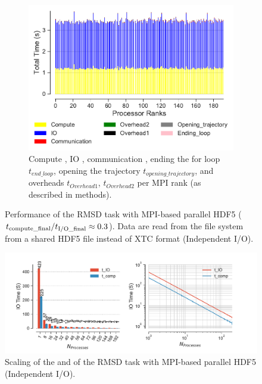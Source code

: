\begin{figure}
\begin{subfigure} {.8\textwidth}
  \includegraphics[width=\linewidth]{figures/hdf5-BarPlot-rank-comparison_192_4.pdf}
  \caption{Compute \tcomp, IO \tIO, communication \tcomm , ending the for loop $t_{end\_loop}$,
  opening the trajectory $t_{opening\_trajectory}$, and overheads $t_{Overhead1}$,  $t_{Overhead2}$ per MPI rank (as described in methods).}
  \label{fig:MPIranks-hdf5}
\end{subfigure}
%
\caption{Performance of the RMSD task with MPI-based parallel HDF5 (${t}_{\text{compute\_final}}/{t}_{\text{I/O\_final}} \approx 0.3$).
Data are read from the file system from a shared HDF5 file instead of XTC format (Independent I/O).}
\label{fig:MPIwithIO-hdf5}
\end{figure}

\begin{figure}
\centering
  \includegraphics[width=\linewidth]{figures/hdf5-time_IO_comparison.pdf}
\caption{Scaling of the \tcomp and \tIO of the RMSD task with MPI-based parallel HDF5 (Independent I/O).}
\label{fig:ScalingComputeIO-hdf5}
\end{figure}


